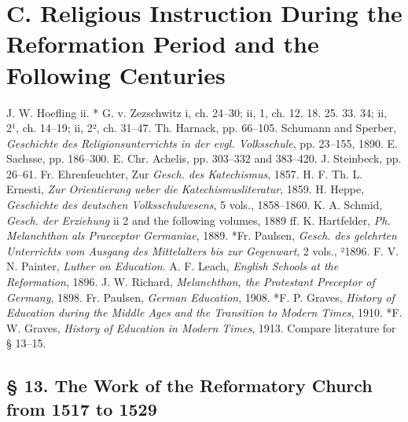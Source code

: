 \chapter[C. Religious Instruction During the Reformation Period]{C. Religious Instruction During the Reformation Period and the Following Centuries}

J. W. Hoefling ii. * G. v. Zezschwitz i, ch. 24–30; ii, 1, ch. 12. 18. 25. 33. 34; ii, 2¹, ch. 14–19; ii, 2², ch. 31–47. Th. Harnack, pp. 66–105. Schumann and Sperber, \emph{Geschichte des Religionsunterrichts in der evgl. Volksschule}, pp. 23–155, 1890. E. Sachsse, pp. 186–300. E. Chr. Achelis, pp. 303–332 and 383–420. J. Steinbeck, pp. 26–61. Fr. Ehrenfeuchter, Zur \emph{Gesch. des Katechismus}, 1857. H. F. Th. L. Ernesti, \emph{Zur Orientierung ueber die Katechismusliteratur}, 1859. H. Heppe, \emph{Geschichte des deutschen Volksschulwesens}, 5 vols., 1858–1860. K. A. Schmid, \emph{Gesch. der Erziehung} ii 2 and the following volumes, 1889 ff. K. Hartfelder, \emph{Ph. Melanchthon als Praeceptor Germaniae}, 1889. *Fr. Paulsen, \emph{Gesch. des gelehrten Unterrichts vom Ausgang des Mittelalters bis zur Gegenwart}, 2 vols., ²1896. F. V. N. Painter, \emph{Luther on Education}. A. F. Leach, \emph{English Schools at the Reformation}, 1896. J. W. Richard, \emph{Melanchthon, the Protestant Preceptor of Germany}, 1898. Fr. Paulsen, \emph{German Education}, 1908. *F. P. Graves, \emph{History of Education during the Middle Ages and the Transition to Modern Times}, 1910. *F. W. Graves, \emph{History of Education in Modern Times}, 1913. Compare literature for § 13–15.

\section[§ 13. The Work of the Reformatory Church]{§ 13. The Work of the Reformatory Church from 1517 to 1529}

